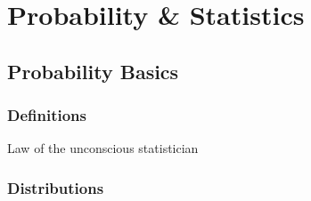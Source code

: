 \chapter{Probability \& Statistics}
\section{Probability Basics}


\subsection{Definitions}

Law of the unconscious statistician

\subsection{Distributions}
